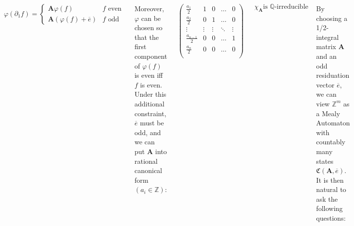 \documentclass[24pt]{tikzposter}
\theoremstyle{definition}
\newcommand{\Z}{\mathbb{Z}}
\newcommand{\Q}{\mathbb{Q}}
\newcommand{\del}{\partial}
\begin{document}
\begin{columns}
{    \bigskip

    \[ 
      \varphi(\del_1 f) = 
      \begin{cases} 
        \mathbf{A} \varphi(f) & \text{$f$ even} \\
        \mathbf{A} (\varphi(f) + \overline{e}) & \text{$f$ odd}
      \end{cases}
    \]

    \bigskip
    \bigskip

    Moreover, $\varphi$ can be chosen so that the first component of 
    $\varphi(f)$ is even iff $f$ is even. Under this additional constraint,
    $\overline{e}$ must be odd, and we can put $\mathbf{A}$ into 
    rational canonical form $(a_{i} \in \Z)$:

    \[
      \begin{pmatrix}
        \frac{a_1}{2}     & 1      & 0      & \dots  & 0\\
        \frac{a_2}{2}     & 0      & 1      & \dots  & 0\\ 
        \vdots            & \vdots & \vdots & \ddots & \vdots\\
        \frac{a_{n-1}}{2} & 0      & 0      & \dots  & 1\\
        \frac{a_n}{2}     & 0      & 0      & \dots  & 0\\
      \end{pmatrix}
    \]

    \[ \chi_\mathbf{A} \text{is $\Q$-irreducible} \]

  }



  {
    By choosing a 1/2-integral matrix $\mathbf{A}$ and an odd residuation
    vector $\overline{e}$, we can view $\Z^m$ as a Mealy Automaton with
    countably many states $\mathfrak{C}(\mathbf{A},\overline{e})$. 
    It is then natural to ask the following questions:

    \bigskip

    \begin{itemize}
      \item For which choices of $\mathbf{A}$, $\overline{e}$ can we find
        a machine $\mathcal{A}$ as a subautomaton of 
        $\mathfrak{C}(\mathbf{A}, \overline{e})$?

      \item For which $\overline{e}$ is 
        $\mathcal{G}(\mathcal{A}) \cong \mathfrak{C}(\mathbf{A},\overline{e})$
        as an automaton?


\end{itemize}}
\end{columns}
\end{document}
